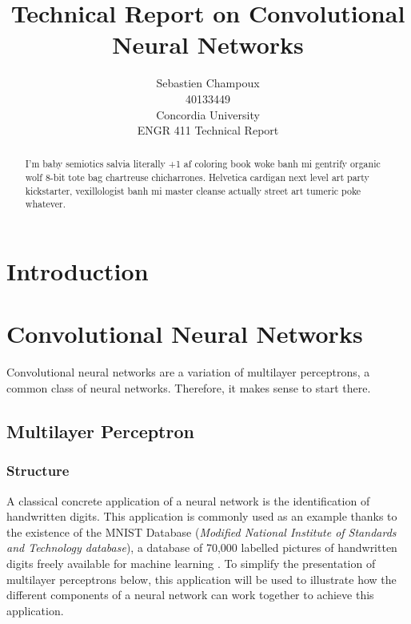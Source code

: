 \documentclass[12pt,a4paper,titlepage]{article}
\begin{document}
\title{Technical Report on Convolutional Neural Networks}
\author{Sebastien Champoux
\\ 40133449
\\ Concordia University
\\ ENGR 411 Technical Report
}
\maketitle

\begin{abstract}
I'm baby semiotics salvia literally +1 af coloring book woke banh mi gentrify organic wolf 8-bit tote bag chartreuse chicharrones. Helvetica cardigan next level art party kickstarter, vexillologist banh mi master cleanse actually street art tumeric poke whatever.
\end{abstract}
\clearpage

\tableofcontents
\clearpage

\listoffigures
\clearpage

\section{Introduction}

\section{Convolutional Neural Networks}
Convolutional neural networks are a variation of multilayer perceptrons, a common class of neural networks. Therefore, it makes sense to start there.

\subsection{Multilayer Perceptron}
\subsubsection{Structure}
A classical concrete application of a neural network is the identification of handwritten digits. This application is commonly used as an example thanks to the existence of the MNIST Database (\textit{Modified National Institute of Standards and Technology database}), a database of 70,000 labelled pictures of handwritten digits freely available for machine learning \cite{lecun_mnist_1998}. To simplify the presentation of multilayer perceptrons below, this application will be used to illustrate how the different components of a neural network can work together to achieve this application.
\end{document}
